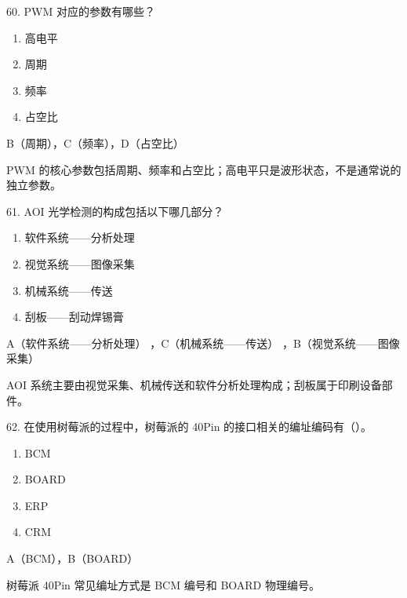\begin{question}{60. PWM 对应的参数有哪些？}
\begin{enumerate}[label=\Alph*., leftmargin=2.4em, itemsep=0.2em]
\item 高电平
\item 周期
\item 频率
\item 占空比
\end{enumerate}
\end{question}
\begin{answer}
B（周期），C（频率），D（占空比）
\end{answer}
\begin{explanation}
PWM 的核心参数包括周期、频率和占空比；高电平只是波形状态，不是通常说的独立参数。
\end{explanation}

\begin{question}{61. AOI 光学检测的构成包括以下哪几部分？}
\begin{enumerate}[label=\Alph*., leftmargin=2.4em, itemsep=0.2em]
\item 软件系统——分析处理
\item 视觉系统——图像采集
\item 机械系统——传送
\item 刮板——刮动焊锡膏
\end{enumerate}
\end{question}
\begin{answer}
A（软件系统——分析处理） ，C（机械系统——传送） ，B（视觉系统——图像采集）
\end{answer}
\begin{explanation}
AOI 系统主要由视觉采集、机械传送和软件分析处理构成；刮板属于印刷设备部件。
\end{explanation}

\begin{question}{62. 在使用树莓派的过程中，树莓派的 40Pin 的接口相关的编址编码有（）。}
\begin{enumerate}[label=\Alph*., leftmargin=2.4em, itemsep=0.2em]
\item BCM
\item BOARD
\item ERP
\item CRM
\end{enumerate}
\end{question}
\begin{answer}
A（BCM），B（BOARD）
\end{answer}
\begin{explanation}
树莓派 40Pin 常见编址方式是 BCM 编号和 BOARD 物理编号。
\end{explanation}


